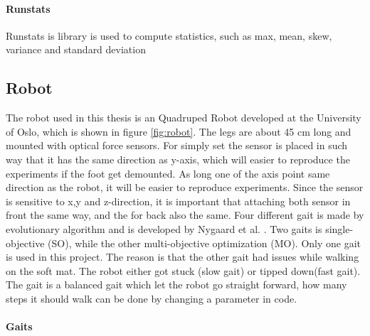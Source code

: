 \documentclass[USenglish]{ifimaster}  %
\begin{document}
\paragraph{Runstats}
Runstats is library is used to compute statistics, such as max, mean, skew, variance and standard deviation \cite{runstats}


\subsection{Robot}
The robot used in this thesis is an Quadruped Robot developed at the University of Oslo, which is shown in figure \ref{fig:robot}. The legs are about 45 cm long and mounted with optical force sensors. For simply set the sensor is placed in such way that it has the same direction as y-axis, which will easier to reproduce the experiments if the foot get demounted. As long one of the axis point same direction as the robot, it will be easier to reproduce experiments. Since the sensor is sensitive to x,y and z-direction, it is important that attaching both sensor in front the same way, and the for back also the same. Four different gait is made by evolutionary algorithm and is developed by Nygaard et al. \cite{7850167}. Two gaits is single-objective (SO), while the other multi-objective optimization
(MO). Only one gait is used in this project. The reason is that the other gait had issues while walking on the soft mat. The robot either got stuck (slow gait) or tipped down(fast gait). The gait is a balanced gait which let the robot go straight forward, how many steps it should walk can be done by changing a parameter in code. 

\paragraph{Gaits}
\end{document}
